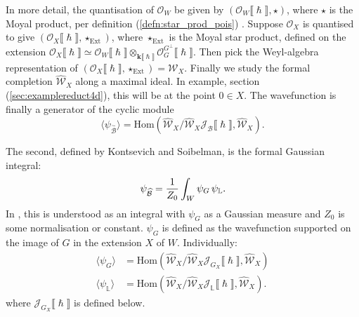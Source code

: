     In more detail, the quantisation of \(\mathcal{O}_W\) be given by \( ( \mathcal{O}_W \lBrack \hslash \rBrack , \star)\), where \( \star\) is the Moyal product, per definition (\ref{defn:star_prod_pois}) . Suppose \( \mathcal{O}_X \) is quantised to give \( (\mathcal{O}_X\lBrack \hslash \rBrack , \star_{\mathrm{Ext}})\), where \( \star_{\mathrm{Ext}}\) is the Moyal star product, defined on the extension \( 
   \mathcal{O}_X\lBrack \hslash \rBrack \simeq \mathcal{O}_W \lBrack \hslash \rBrack \otimes_{\mathbf{k}\lBrack \hslash \rBrack} \mathcal{O}_{G}^{G^{\perp}} \lBrack \hslash \rBrack \).  Then pick the Weyl-algebra representation of \( (\mathcal{O}_X\lBrack \hslash \rBrack , \star_{\mathrm{Ext}}) = \mathcal{W}_X\). Finally we study the formal completion \( \widehat{\mathcal{W}}_X \) along a maximal ideal. In  example, section (\ref{sec:examplereduct4d}), this will be at the point \(0 \in X\). The wavefunction is finally a generator of the cyclic module 
   \[ \langle \psi_{\overset{\sim}{\mathcal{B}}} \rangle =  \mathrm{Hom}\left( \widehat{\mathcal{W}}_X / \widehat{\mathcal{W}}_X \mathcal{J}_{\mathcal{B}}\lBrack \hslash \rBrack , \widehat{\mathcal{W}}_X \right).\]
   
    The second, defined by Kontsevich and Soibelman, is the formal Gaussian integral: 
    \[ \psi_{\widehat{\mathcal{B}}} = \frac{1}{Z_0} \int_{W} \psi_G  \,  \psi_{\mathbb{L}}. \]
    In \cite[page 53]{ks_airy}, this is understood as an integral with \(\psi_G\) as a Gaussian measure and \(Z_0\) is some normalisation or constant. \( \psi_{G}\) is defined as the wavefunction supported on the image of \(G \) in the extension \(X\) of \(W\). Individually:
    \begin{align}
    \label{eqn:psigext}
        \langle \psi_{G} \rangle &=  \mathrm{Hom}\left( \widehat{\mathcal{W}}_X / \widehat{\mathcal{W}}_X \mathcal{J}_{G_X}\lBrack \hslash \rBrack , \widehat{\mathcal{W}}_X \right)\\
        \langle \psi_{\mathbb{L}} \rangle &=  \mathrm{Hom}\left( \widehat{\mathcal{W}}_X / \widehat{\mathcal{W}}_X \mathcal{J}_{\mathbb{L}}\lBrack \hslash \rBrack , \widehat{\mathcal{W}}_X \right).
    \end{align}
    where \(\mathcal{J}_{G_X}\lBrack \hslash \rBrack\) is defined below.
    

